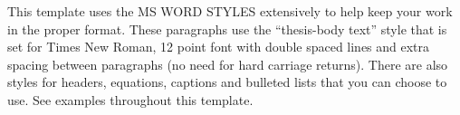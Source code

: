 This template uses the MS WORD STYLES extensively to help keep your work in the proper format.  These paragraphs use the “thesis-body text” style that is set for Times New Roman, 12 point font with double spaced lines and extra spacing between paragraphs (no need for hard carriage returns).  There are also styles for headers, equations, captions and bulleted lists that you can choose to use.  See examples throughout this template.

